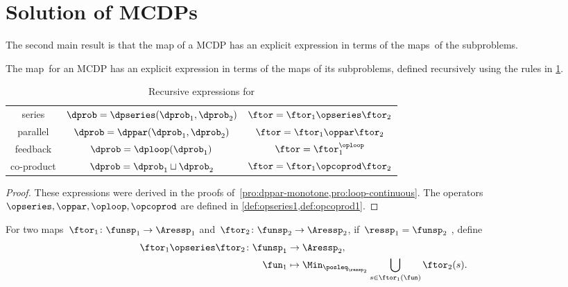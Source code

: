 

\section{Solution of MCDPs}
\label{sec:Solution-of-Monotone}

The second main result is that the map \ftor of a MCDP has an explicit
expression in terms of the maps~\ftor of the subproblems.


\begin{theorem}
  \label{thm:CDP-solvig}The map~\ftor for an MCDP has an explicit
  expression in terms of the maps \ftor of its subproblems, defined
  recursively using the rules in \cref{tab:Correspondence}.
\end{theorem}

\begin{table}[h]
  \begin{centering}
    \caption{Recursive expressions for \ftor\label{tab:Correspondence}}
  \end{centering}
  \centering{}\setlength\extrarowheight{5pt}\normalsize
  \begin{tabular}{ccc}
    series & $\dprob=\dpseries(\dprob_{1},\dprob_{2})$ & $\ftor=\ftor_{1}\opseries\ftor_{2}$\tabularnewline
    parallel & $\dprob=\dppar(\dprob_{1},\dprob_{2})$ & $\ftor=\ftor_{1}\oppar\ftor_{2}$\tabularnewline
    feedback & $\dprob=\dploop(\dprob_{1})$ & $\ftor=\ftor_{1}^{\oploop}$\tabularnewline
    co-product & $\dprob=\dprob_{1}\sqcup\dprob_{2}$ & $\ftor=\ftor_{1}\opcoprod\ftor_{2}$\tabularnewline
  \end{tabular}
\end{table}

\begin{proof}
  These expressions were derived in the proofs of~\cref{pro:dppar-monotone,pro:loop-continuous}.
  The operators $\opseries,\oppar,\oploop,\opcoprod$ are defined
  in \cref{def:opseries1,def:opcoprod1}.
\end{proof}
\begin{definition}
  \label{def:opseries1}
  For two maps~$\ftor_{1}\colon\funsp_{1}\rightarrow\Aressp_{1}$
  and~$\ftor_{2}\colon\funsp_{2}\rightarrow\Aressp_{2}$, if~$\ressp_{1}=\funsp_{2}$
  , define
  \begin{align*}
  {\displaystyle \ftor_{1}\opseries\ftor_{2}\colon\funsp_{1}}
    & \rightarrow\Aressp_{2},\\
    \fun_{1} & \mapsto\Min_{\posleq_{\ressp_{2}}}\bigcup_{s\in\ftor_{1}(\fun)}\ftor_{2}(s).
  \end{align*}
\end{definition}

